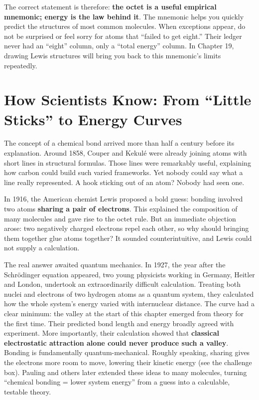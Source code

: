 The correct statement is therefore: \textbf{the octet is a useful empirical mnemonic; energy is the law behind it}. The mnemonic helps you quickly predict the structures of most common molecules. When exceptions appear, do not be surprised or feel sorry for atoms that ``failed to get eight.'' Their ledger never had an ``eight'' column, only a ``total energy'' column. In Chapter 19, drawing Lewis structures will bring you back to this mnemonic's limits repeatedly.

\section{How Scientists Know: From ``Little Sticks'' to Energy Curves}

\begin{zhengju}
The concept of a chemical bond arrived more than half a century before its explanation. Around 1858, Couper and Kekul\'e were already joining atoms with short lines in structural formulas. Those lines were remarkably useful, explaining how carbon could build such varied frameworks. Yet nobody could say what a line really represented. A hook sticking out of an atom? Nobody had seen one.

In 1916, the American chemist Lewis proposed a bold guess: bonding involved two atoms \textbf{sharing a pair of electrons}. This explained the composition of many molecules and gave rise to the octet rule. But an immediate objection arose: two negatively charged electrons repel each other, so why should bringing them together glue atoms together? It sounded counterintuitive, and Lewis could not supply a calculation.

The real answer awaited quantum mechanics. In 1927, the year after the Schr\"odinger equation appeared, two young physicists working in Germany, Heitler and London, undertook an extraordinarily difficult calculation. Treating both nuclei and electrons of two hydrogen atoms as a quantum system, they calculated how the whole system's energy varied with internuclear distance. The curve had a clear minimum: the valley at the start of this chapter emerged from theory for the first time. Their predicted bond length and energy broadly agreed with experiment. More importantly, their calculation showed that \textbf{classical electrostatic attraction alone could never produce such a valley}. Bonding is fundamentally quantum-mechanical. Roughly speaking, sharing gives the electrons more room to move, lowering their kinetic energy (see the challenge box). Pauling and others later extended these ideas to many molecules, turning ``chemical bonding = lower system energy'' from a guess into a calculable, testable theory.


\end{zhengju}
